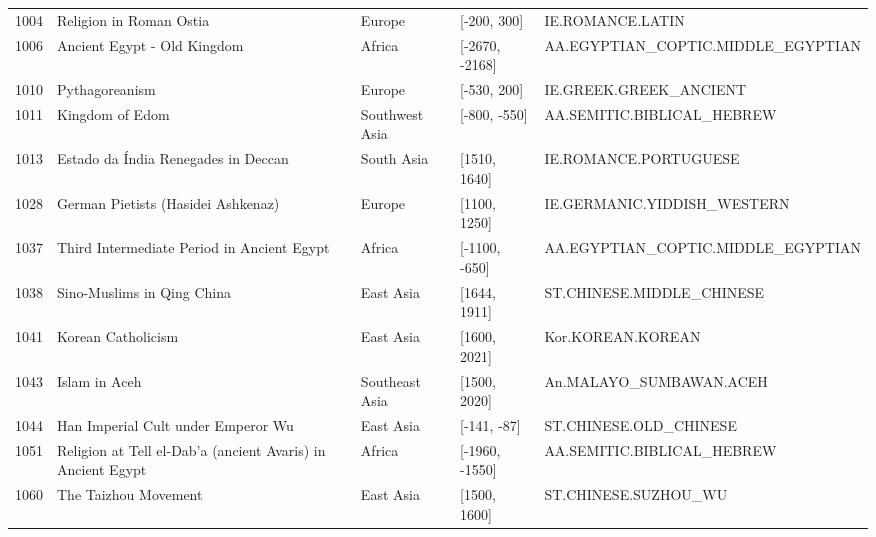 {\begin{longtable}{rp{3.5cm}llp{3.5cm}}
1004 & {\raggedright Religion in Roman Ostia} & Europe & [-200, 300] & {\raggedright IE.\allowbreak{}ROMANCE.\allowbreak{}LATIN} \\
1006 & {\raggedright Ancient Egypt - Old Kingdom} & Africa & [-2670, -2168] & {\raggedright AA.\allowbreak{}EGYPTIAN\_\allowbreak{}COPTIC.\allowbreak{}MIDDLE\_\allowbreak{}EGYPTIAN} \\
1010 & {\raggedright Pythagoreanism} & Europe & [-530, 200] & {\raggedright IE.\allowbreak{}GREEK.\allowbreak{}GREEK\_\allowbreak{}ANCIENT} \\
1011 & {\raggedright Kingdom of Edom} & Southwest Asia & [-800, -550] & {\raggedright AA.\allowbreak{}SEMITIC.\allowbreak{}BIBLICAL\_\allowbreak{}HEBREW} \\
1013 & {\raggedright Estado da Índia Renegades in Deccan} & South Asia & [1510, 1640] & {\raggedright IE.\allowbreak{}ROMANCE.\allowbreak{}PORTUGUESE} \\
1028 & {\raggedright German Pietists (Hasidei Ashkenaz)} & Europe & [1100, 1250] & {\raggedright IE.\allowbreak{}GERMANIC.\allowbreak{}YIDDISH\_\allowbreak{}WESTERN} \\
1037 & {\raggedright Third Intermediate Period in Ancient Egypt} & Africa & [-1100, -650] & {\raggedright AA.\allowbreak{}EGYPTIAN\_\allowbreak{}COPTIC.\allowbreak{}MIDDLE\_\allowbreak{}EGYPTIAN} \\
1038 & {\raggedright Sino-Muslims in Qing China} & East Asia & [1644, 1911] & {\raggedright ST.\allowbreak{}CHINESE.\allowbreak{}MIDDLE\_\allowbreak{}CHINESE} \\
1041 & {\raggedright Korean Catholicism} & East Asia & [1600, 2021] & {\raggedright Kor.\allowbreak{}KOREAN.\allowbreak{}KOREAN} \\
1043 & {\raggedright Islam in Aceh} & Southeast Asia & [1500, 2020] & {\raggedright An.\allowbreak{}MALAYO\_\allowbreak{}SUMBAWAN.\allowbreak{}ACEH} \\
1044 & {\raggedright Han Imperial Cult under Emperor Wu} & East Asia & [-141, -87] & {\raggedright ST.\allowbreak{}CHINESE.\allowbreak{}OLD\_\allowbreak{}CHINESE} \\
1051 & {\raggedright Religion at Tell el-Dab'a (ancient Avaris) in Ancient Egypt} & Africa & [-1960, -1550] & {\raggedright AA.\allowbreak{}SEMITIC.\allowbreak{}BIBLICAL\_\allowbreak{}HEBREW} \\
1060 & {\raggedright The Taizhou Movement} & East Asia & [1500, 1600] & {\raggedright ST.\allowbreak{}CHINESE.\allowbreak{}SUZHOU\_\allowbreak{}WU} \\

\end{longtable}}
